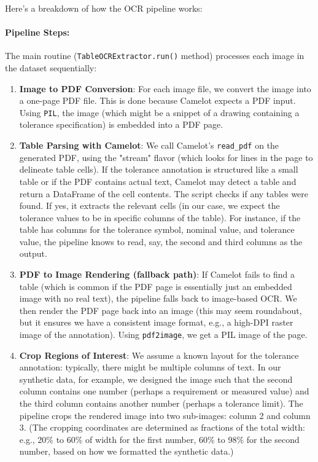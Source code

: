 \documentclass[11pt,a4paper]{article}
\begin{document}
Here’s a breakdown of how the OCR pipeline works:

\paragraph{Pipeline Steps:} The main routine (\verb|TableOCRExtractor.run()| method) processes each image in the dataset sequentially:
\begin{enumerate}
    \item \textbf{Image to PDF Conversion}: For each image file, we convert the image into a one-page PDF file. This is done because Camelot expects a PDF input. Using \verb|PIL|, the image (which might be a snippet of a drawing containing a tolerance specification) is embedded into a PDF page.
    \item \textbf{Table Parsing with Camelot}: We call Camelot’s \verb|read_pdf| on the generated PDF, using the "stream" flavor (which looks for lines in the page to delineate table cells). If the tolerance annotation is structured like a small table or if the PDF contains actual text, Camelot may detect a table and return a DataFrame of the cell contents. The script checks if any tables were found. If yes, it extracts the relevant cells (in our case, we expect the tolerance values to be in specific columns of the table). For instance, if the table has columns for the tolerance symbol, nominal value, and tolerance value, the pipeline knows to read, say, the second and third columns as the output.
    \item \textbf{PDF to Image Rendering (fallback path)}: If Camelot fails to find a table (which is common if the PDF page is essentially just an embedded image with no real text), the pipeline falls back to image-based OCR. We then render the PDF page back into an image (this may seem roundabout, but it ensures we have a consistent image format, e.g., a high-DPI raster image of the annotation). Using \verb|pdf2image|, we get a PIL image of the page.
    \item \textbf{Crop Regions of Interest}: We assume a known layout for the tolerance annotation: typically, there might be multiple columns of text. In our synthetic data, for example, we designed the image such that the second column contains one number (perhaps a requirement or measured value) and the third column contains another number (perhaps a tolerance limit). The pipeline crops the rendered image into two sub-images: column 2 and column 3. (The cropping coordinates are determined as fractions of the total width: e.g., 20\% to 60\% of width for the first number, 60\% to 98\% for the second number, based on how we formatted the synthetic data.)

\end{enumerate}
\end{document}
